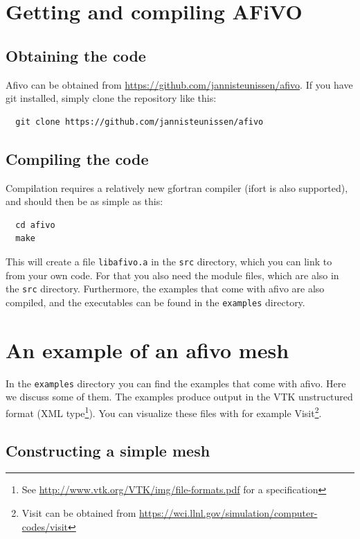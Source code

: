 \documentclass[a4paper, a4wide]{article}
\begin{document}
\section{Getting and compiling AFiVO}
\label{sec:getting-started}

\subsection{Obtaining the code}
\label{sec:obtaining}

Afivo can be obtained from \url{https://github.com/jannisteunissen/afivo}. If
you have git installed, simply clone the repository like this:

\begin{lstlisting}
  git clone https://github.com/jannisteunissen/afivo
\end{lstlisting}

\subsection{Compiling the code}
\label{sec:compilation}

Compilation requires a relatively new gfortran compiler (ifort is also
supported), and should then be as simple as this:
\begin{lstlisting}
  cd afivo
  make
\end{lstlisting}
This will create a file \texttt{libafivo.a} in the \texttt{src} directory, which
you can link to from your own code.
For that you also need the module files, which are also in the \texttt{src}
directory.
Furthermore, the examples that come with afivo are also compiled, and the
executables can be found in the \texttt{examples} directory.

\lstset{language=[08]Fortran}
\section{An example of an afivo mesh}
\label{sec:examples}

In the \texttt{examples} directory you can find the
examples that come with afivo.
Here we discuss some of them.
The examples produce output in the VTK unstructured format (XML
type\footnote{See \url{http://www.vtk.org/VTK/img/file-formats.pdf} for a
  specification}).
You can visualize these files with for example Visit\footnote{Visit can be
  obtained from \url{https://wci.llnl.gov/simulation/computer-codes/visit}}.

\subsection{Constructing a simple mesh}
\label{sec:example-base}
\end{document}
